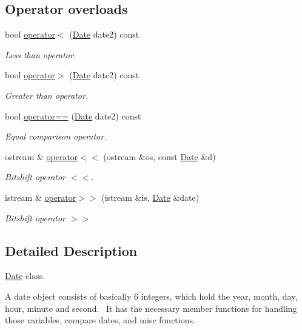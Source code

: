 \subsection*{Operator overloads}
\begin{DoxyCompactItemize}
\item 
bool \hyperlink{class_date_a1629ad0fa9f5272f887cbe399d0d2458}{operator$<$} (\hyperlink{class_date}{Date} date2) const 
\begin{DoxyCompactList}\small\item\em Less than operator. \end{DoxyCompactList}\item 
bool \hyperlink{class_date_ac4959607f38ae31aa1096d7ffc71e871}{operator$>$} (\hyperlink{class_date}{Date} date2) const 
\begin{DoxyCompactList}\small\item\em Greater than operator. \end{DoxyCompactList}\item 
bool \hyperlink{class_date_a4a2facbaa5e9a131387c1fec733dfe2a}{operator==} (\hyperlink{class_date}{Date} date2) const 
\begin{DoxyCompactList}\small\item\em Equal comparison operator. \end{DoxyCompactList}\item 
ostream \& \hyperlink{class_date_a8e8b3d76200d2f9bc2eefc5c30b1f326}{operator$<$$<$} (ostream \&os, const \hyperlink{class_date}{Date} \&d)
\begin{DoxyCompactList}\small\item\em Bitshift operator $<$$<$. \end{DoxyCompactList}\item 
istream \& \hyperlink{class_date_a15e1a93c6cc284b431e2d865fd193e18}{operator$>$$>$} (istream \&is, \hyperlink{class_date}{Date} \&date)
\begin{DoxyCompactList}\small\item\em Bitshift operator $>$$>$ \end{DoxyCompactList}\end{DoxyCompactItemize}


\subsection{Detailed Description}
\hyperlink{class_date}{Date} class. 

A date object consists of basically 6 integers, which hold the year, month, day, hour, minute and second.~\newline
It has the necessary member functions for handling those variables, compare dates, and misc functions. 


